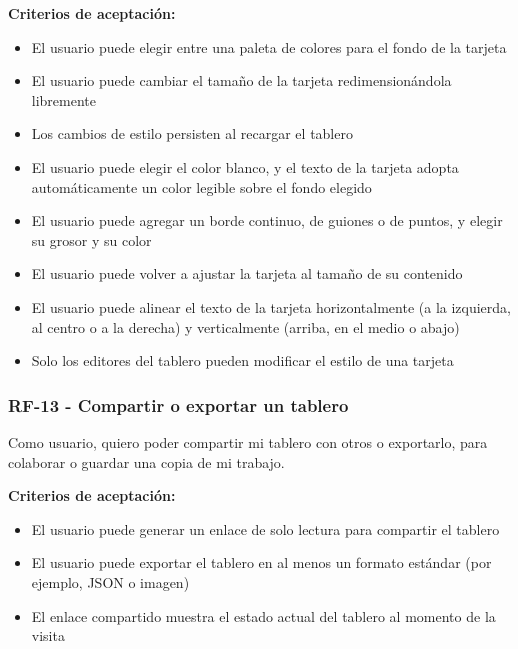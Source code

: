 \textbf{Criterios de aceptación:}
\begin{itemize}
  \item El usuario puede elegir entre una paleta de colores para el fondo de la tarjeta
  \item El usuario puede cambiar el tamaño de la tarjeta redimensionándola libremente
  \item Los cambios de estilo persisten al recargar el tablero
  \item El usuario puede elegir el color blanco, y el texto de la tarjeta adopta automáticamente un color legible sobre el fondo elegido
  \item El usuario puede agregar un borde continuo, de guiones o de puntos, y elegir su grosor y su color
  \item El usuario puede volver a ajustar la tarjeta al tamaño de su contenido
  \item El usuario puede alinear el texto de la tarjeta horizontalmente (a la izquierda, al centro o a la derecha) y verticalmente (arriba, en el medio o abajo)
  \item Solo los editores del tablero pueden modificar el estilo de una tarjeta
\end{itemize}

\subsubsection*{RF-13 - Compartir o exportar un tablero}
Como usuario, quiero poder compartir mi tablero con otros o exportarlo, para colaborar o guardar una copia de mi trabajo.

\textbf{Criterios de aceptación:}
\begin{itemize}
  \item El usuario puede generar un enlace de solo lectura para compartir el tablero
  \item El usuario puede exportar el tablero en al menos un formato estándar (por ejemplo, JSON o imagen)
  \item El enlace compartido muestra el estado actual del tablero al momento de la visita
\end{itemize}